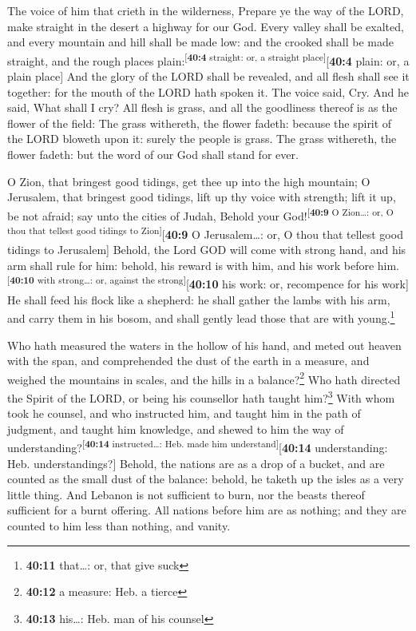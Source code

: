  The voice of him that crieth in the wilderness, Prepare
ye the way of the LORD, make straight in the desert a highway for our
God.  Every valley shall be exalted, and every mountain
and hill shall be made low: and the crooked shall be made straight, and
the rough places plain:\textsuperscript{{[}\textbf{40:4} straight: or, a
straight place{]}}{[}\textbf{40:4} plain: or, a plain place{]}
 And the glory of the LORD shall be revealed, and all
flesh shall see it together: for the mouth of the LORD hath spoken it.
 The voice said, Cry. And he said, What shall I cry? All
flesh is grass, and all the goodliness thereof is as the flower of the
field:  The grass withereth, the flower fadeth: because
the spirit of the LORD bloweth upon it: surely the people is grass.
 The grass withereth, the flower fadeth: but the word of
our God shall stand for ever.

 O Zion, that bringest good tidings, get thee up into the
high mountain; O Jerusalem, that bringest good tidings, lift up thy
voice with strength; lift it up, be not afraid; say unto the cities of
Judah, Behold your God!\textsuperscript{{[}\textbf{40:9} O Zion\ldots:
or, O thou that tellest good tidings to Zion{]}}{[}\textbf{40:9} O
Jerusalem\ldots: or, O thou that tellest good tidings to Jerusalem{]}
 Behold, the Lord GOD will come with strong hand, and his
arm shall rule for him: behold, his reward is with him, and his work
before him.\textsuperscript{{[}\textbf{40:10} with strong\ldots: or,
against the strong{]}}{[}\textbf{40:10} his work: or, recompence for his
work{]}  He shall feed his flock like a shepherd: he
shall gather the lambs with his arm, and carry them in his bosom, and
shall gently lead those that are with young.\footnote{\textbf{40:11}
  that\ldots: or, that give suck}

 Who hath measured the waters in the hollow of his hand,
and meted out heaven with the span, and comprehended the dust of the
earth in a measure, and weighed the mountains in scales, and the hills
in a balance?\footnote{\textbf{40:12} a measure: Heb. a tierce}
 Who hath directed the Spirit of the LORD, or being his
counsellor hath taught him?\footnote{\textbf{40:13} his\ldots: Heb. man
  of his counsel}  With whom took he counsel, and who
instructed him, and taught him in the path of judgment, and taught him
knowledge, and shewed to him the way of
understanding?\textsuperscript{{[}\textbf{40:14} instructed\ldots: Heb.
made him understand{]}}{[}\textbf{40:14} understanding: Heb.
understandings?{]}  Behold, the nations are as a drop of
a bucket, and are counted as the small dust of the balance: behold, he
taketh up the isles as a very little thing.  And Lebanon
is not sufficient to burn, nor the beasts thereof sufficient for a burnt
offering.  All nations before him are as nothing; and
they are counted to him less than nothing, and vanity.

